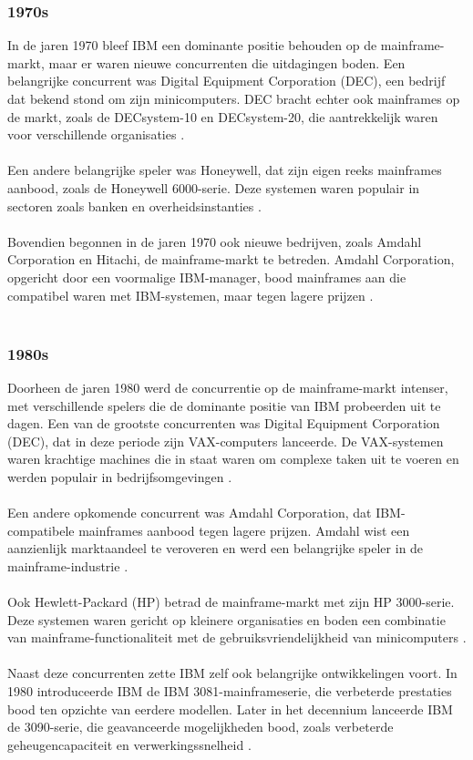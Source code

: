 \subsubsection{1970s}
In de jaren 1970 bleef IBM een dominante positie behouden op de mainframe-markt, maar er waren nieuwe concurrenten die uitdagingen boden. Een belangrijke concurrent was Digital Equipment Corporation (DEC), een bedrijf dat bekend stond om zijn minicomputers. DEC bracht echter ook mainframes op de markt, zoals de DECsystem-10 en DECsystem-20, die aantrekkelijk waren voor verschillende organisaties \autocite{Society2017}.
\\ \\
Een andere belangrijke speler was Honeywell, dat zijn eigen reeks mainframes aanbood, zoals de Honeywell 6000-serie. Deze systemen waren populair in sectoren zoals banken en overheidsinstanties \autocite{Society2017}.
\\ \\
Bovendien begonnen in de jaren 1970 ook nieuwe bedrijven, zoals Amdahl Corporation en Hitachi, de mainframe-markt te betreden. Amdahl Corporation, opgericht door een voormalige IBM-manager, bood mainframes aan die compatibel waren met IBM-systemen, maar tegen lagere prijzen \autocite{Society2017}.
\\ \\
\subsubsection{1980s}
Doorheen de jaren 1980 werd de concurrentie op de mainframe-markt intenser, met verschillende spelers die de dominante positie van IBM probeerden uit te dagen. Een van de grootste concurrenten was Digital Equipment Corporation (DEC), dat in deze periode zijn VAX-computers lanceerde. De VAX-systemen waren krachtige machines die in staat waren om complexe taken uit te voeren en werden populair in bedrijfsomgevingen \autocite{Society2017}.
\\ \\
Een andere opkomende concurrent was Amdahl Corporation, dat IBM-compatibele mainframes aanbood tegen lagere prijzen. Amdahl wist een aanzienlijk marktaandeel te veroveren en werd een belangrijke speler in de mainframe-industrie \autocite{Society2017}.
\\ \\
Ook Hewlett-Packard (HP) betrad de mainframe-markt met zijn HP 3000-serie. Deze systemen waren gericht op kleinere organisaties en boden een combinatie van mainframe-functionaliteit met de gebruiksvriendelijkheid van minicomputers \autocite{Society2017}.
\\ \\
Naast deze concurrenten zette IBM zelf ook belangrijke ontwikkelingen voort. In 1980 introduceerde IBM de IBM 3081-mainframeserie, die verbeterde prestaties bood ten opzichte van eerdere modellen. Later in het decennium lanceerde IBM de 3090-serie, die geavanceerde mogelijkheden bood, zoals verbeterde geheugencapaciteit en verwerkingssnelheid \autocite{Society2017}.
\\ \\
